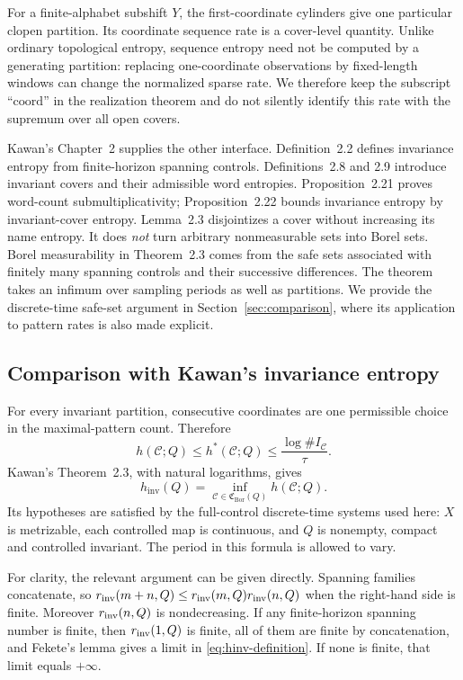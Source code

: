 \documentclass[11pt,reqno]{amsart}
\numberwithin{equation}{section}
\theoremstyle{definition}
\newcommand{\C}{\mathcal C}
\newcommand{\hpat}{h^{*}}
\newcommand{\hinv}{h_{\mathrm{inv}}}
\newcommand{\Bor}{\mathrm{Bor}}
\begin{document}
For a finite-alphabet subshift $Y$, the first-coordinate cylinders give
one particular clopen partition. Its coordinate sequence rate is a
cover-level quantity. Unlike ordinary topological entropy, sequence
entropy need not be computed by a generating partition: replacing
one-coordinate observations by fixed-length windows can change the
normalized sparse rate. We therefore keep the subscript
``$\mathrm{coord}$'' in the realization theorem and do not silently
identify this rate with the supremum over all open covers.

Kawan's Chapter~2 supplies the other interface. Definition~2.2 defines
invariance entropy from finite-horizon spanning controls.
Definitions~2.8 and 2.9 introduce invariant covers and their admissible
word entropies. Proposition~2.21 proves word-count submultiplicativity;
Proposition~2.22 bounds invariance entropy by invariant-cover entropy.
Lemma~2.3 disjointizes a cover without increasing its name entropy.
It does \emph{not} turn arbitrary nonmeasurable sets into Borel sets.
Borel measurability in Theorem~2.3 comes from the safe sets associated
with finitely many spanning controls and their successive differences.
The theorem takes an infimum over sampling periods as well as
partitions. We provide the discrete-time safe-set argument in
Section~\ref{sec:comparison}, where its application to pattern rates is
also made explicit.


\subsection{Comparison with Kawan's invariance entropy}
For every invariant partition, consecutive coordinates are one permissible
choice in the maximal-pattern count. Therefore
\begin{equation}\label{eq:ordinary-pattern-one-sided}
 h(\C;Q)\le\hpat(\C;Q)\le\frac{\log\#I_\C}{\tau}.
\end{equation}
Kawan's Theorem~2.3, with natural logarithms, gives
\begin{equation}\label{eq:kawan-characterization}
 \hinv(Q)=\inf_{\C\in\mathfrak C_{\Bor}(Q)}h(\C;Q).
\end{equation}
Its hypotheses are satisfied by the full-control discrete-time systems
used here: $X$ is metrizable, each controlled map is continuous, and
$Q$ is nonempty, compact and controlled invariant.
The period in this formula is allowed to vary.

For clarity, the relevant argument can be given directly. Spanning
families concatenate, so
$r_{\rm inv}(m+n,Q)\le r_{\rm inv}(m,Q)r_{\rm inv}(n,Q)$ when the
right-hand side is finite. Moreover $r_{\rm inv}(n,Q)$ is nondecreasing.
If any finite-horizon spanning number is finite, then $r_{\rm inv}(1,Q)$
is finite, all of them are finite by concatenation, and Fekete's lemma
gives a limit in \eqref{eq:hinv-definition}. If none is finite, that
limit equals $+\infty$.
\end{document}
